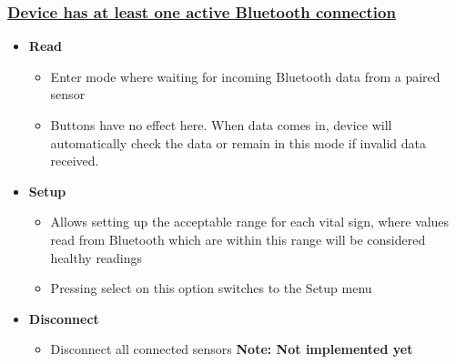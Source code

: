 \subsubsection{\underline{Device has at least one active Bluetooth connection}}
\begin{itemize}
	\item \textbf{Read}
	\begin{itemize}
		\item Enter mode where waiting for incoming Bluetooth data from a paired sensor
		\item Buttons have no effect here. When data comes in, device will automatically check the data or remain in this mode if invalid data received.
	\end{itemize}
	\item \textbf{Setup}
	\begin{itemize}
		\item Allows setting up the acceptable range for each vital sign, where values read from Bluetooth which are within this range will be considered healthy readings
		\item Pressing select on this option switches to the Setup menu
	\end{itemize}
	\item \textbf{Disconnect}
	\begin{itemize}
		\item Disconnect all connected sensors \textbf{Note: Not implemented yet}
	\end{itemize}
\end{itemize}
